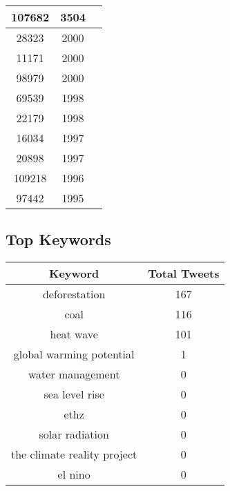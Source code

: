 \documentclass{article}\usepackage[T1]{fontenc}
\begin{document}
\begin{tabular}{|c|c|c|}
 \hline
107682 & 3504\\ 
 \hline
28323 & 2000\\ 
 \hline
11171 & 2000\\ 
 \hline
98979 & 2000\\ 
 \hline
69539 & 1998\\ 
 \hline
22179 & 1998\\ 
 \hline
16034 & 1997\\ 
 \hline
20898 & 1997\\ 
 \hline
109218 & 1996\\ 
 \hline
97442 & 1995\\ 
 \hline
\end{tabular}\subsection*{Top Keywords}\begin{tabular}{|c|c|}         \hline         Keyword & Total Tweets \\ 
 \hline
deforestation & 167\\ 
 \hline
coal & 116\\ 
 \hline
heat wave & 101\\ 
 \hline
global warming potential & 1\\ 
 \hline
water management & 0\\ 
 \hline
sea level rise & 0\\ 
 \hline
ethz & 0\\ 
 \hline
solar radiation & 0\\ 
 \hline
the climate reality project & 0\\ 
 \hline
el nino & 0\\ 
 \hline
\end{tabular}
\end{document}
